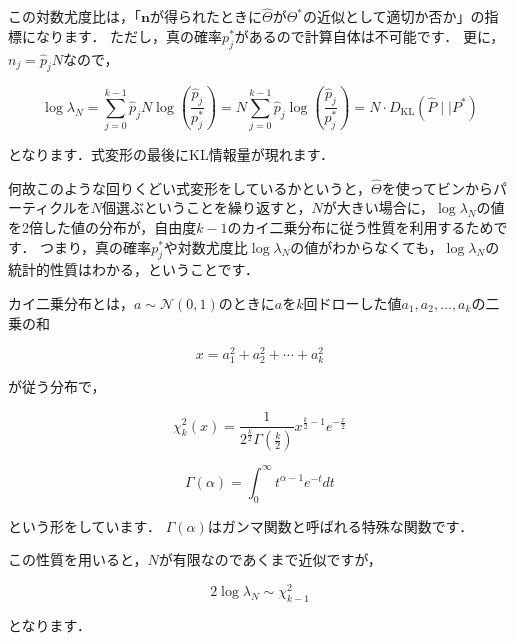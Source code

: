 \documentclass[{../../master}]{subfiles}
\begin{document}
この対数尤度比は，「$\bm{n}$が得られたときに$\hat{\Theta}$が$\Theta^{*}$の近似として適切か否か」の指標になります．
ただし，真の確率$p^{*}_{j}$があるので計算自体は不可能です．
更に，$n_{j} = \hat{p}_{j}N$なので，

\begin{equation}
  \log{\lambda_{N}} = \sum^{k-1}_{j=0} \hat{p}_{j}N\log{\left(\frac{\hat{p}_{j}}{p^{*}_{j}}\right)} = N\sum^{k-1}_{j=0} \hat{p}_{j}\log{\left(\frac{\hat{p}_{j}}{p^{*}_{j}}\right)} = N \cdot D_{\text{KL}}(\hat{P} \mid \mid P^{*})
  \label{eq:log_likelihood_ratio}
\end{equation}

\noindent
となります．式変形の最後にKL情報量が現れます．

何故このような回りくどい式変形をしているかというと，$\hat{\Theta}$を使ってビンからパーティクルを$N$個選ぶということを繰り返すと，$N$が大きい場合に，$\log{\lambda_{N}}$の値を2倍した値の分布が，自由度$k-1$のカイ二乗分布に従う性質を利用するためです．
つまり，真の確率$p^{*}_{j}$や対数尤度比$\log{\lambda_{N}}$の値がわからなくても，$\log{\lambda_{N}}$の統計的性質はわかる，ということです．

カイ二乗分布とは，$a \sim \mathcal{N}(0, 1)$のときに$a$を$k$回ドローした値$a_{1}, a_{2}, \ldots , a_{k}$の二乗の和

\begin{equation}
  x = a_{1}^{2} + a_{2}^{2} + \cdots + a_{k}^{2} 
\end{equation}

\noindent
が従う分布で，

\begin{equation}
    \chi_{k}^{2}(x) = \frac{1}{2^{\frac{k}{2}} \Gamma \left(\frac{k}{2}\right)} x^{\frac{k}{2} - 1}e^{-\frac{x}{2}}
\end{equation}

\begin{equation}
  \Gamma (\alpha) = \int^{\infty}_{0} t^{\alpha - 1} e^{-t} dt
\end{equation}

\noindent
という形をしています．
$\Gamma (\alpha)$はガンマ関数と呼ばれる特殊な関数です．

この性質を用いると，$N$が有限なのであくまで近似ですが，

\begin{equation}
  2 \log{\lambda_{N}} \sim \chi_{k-1}^{2}
  \label{eq:chi_approximation}
\end{equation}

\noindent
となります．
\end{document}
